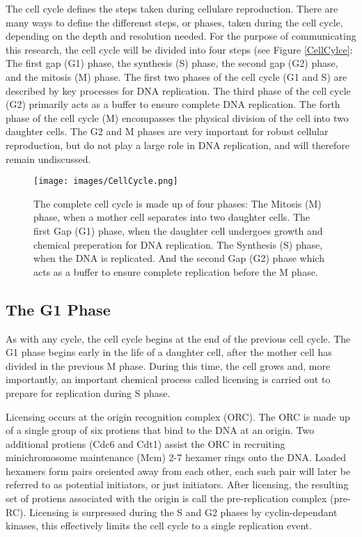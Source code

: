 	The cell cycle defines the steps taken during cellulare reproduction.
	There are many ways to define the differenst steps, or phases, taken during the cell cycle, depending on the depth and resolution needed.
	For the purpose of communicating this research, the cell cycle will be divided into four steps (see Figure \ref{CellCylce}:
	The first gap (G1) phase, the synthesis (S) phase, the second gap (G2) phase, and the mitosis (M) phase.
	The first two phases of the cell cycle (G1 and S) are described by key processes for DNA replication.
	The third phase of the cell cycle (G2) primarily acts as a buffer to ensure complete DNA replication.
	The forth phase of the cell cycle (M) encompasses the physical division of the cell into two daughter cells.
	The G2 and M phases are very important for robust cellular reproduction, but do not play a large role in DNA replication, and will therefore remain undiscussed.
	
	\begin{figure}[b]
		\begin{center}
			\texttt{[image: images/CellCycle.png]}
		\end{center}
			\caption[CellCycle]{\label{CellCycle} The complete cell cycle is made up of four phases: 
				The Mitosis (M) phase, when a mother cell separates into two daughter cells. 
				The first Gap (G1) phase, when the daughter cell undergoes growth and chemical preperation for DNA replication.
				The Synthesis (S) phase, when the DNA is replicated.
				And the second Gap (G2) phase which acts as a buffer to ensure complete replication before the M phase.}
	\end{figure}
	
		\subsection{The G1 Phase}
		
		As with any cycle, the cell cycle begins at the end of the previous cell cycle.
		The G1 phase begins early in the life of a daughter cell, after the mother cell has divided in the previous M phase.
		During this time, the cell grows and, more importantly, an important chemical process called licensing is carried out to prepare for replication during S phase.
		
		Licensing occurs at the origin recognition complex (ORC).
		The ORC is made up of a single group of six protiens that bind to the DNA at an origin.
		Two additional protiens (Cdc6 and Cdt1) assist the ORC in recruiting minichromosome maintenance (Mcm) 2-7 hexamer rings onto the DNA.
		Loaded hexamers form pairs oreiented away from each other, each such pair will later be referred to as potential initiators, or just initiators.
		After licensing, the resulting set of protiens associated with the origin is call the pre-replication complex (pre-RC).
		Licensing is surpressed during the S and G2 phases by cyclin-dependant kinases, this effectively limits the cell cycle to a single replication event.\cite{MolecularCellBiology}
		
